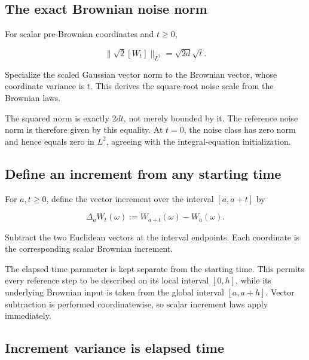 \documentclass[11pt,a4paper]{report}
\begin{document}
\subsection{\texorpdfstring{The exact Brownian noise norm}{The exact Brownian noise norm}}
\label{report-step-UnadjustedLangevin-GaussianMoments-lean-10}


For scalar pre-Brownian coordinates and \(t\ge0\),

\[\|\sqrt2[W_t]\|_{L^2}=\sqrt{2d}\sqrt t.\]

Specialize the scaled Gaussian vector norm to the Brownian vector, whose coordinate variance is \(t\). This derives the square-root noise scale from the Brownian laws.



The squared norm is exactly \(2dt\), not merely bounded by it. The reference noise norm is therefore given by this equality. At \(t=0\), the noise class has zero norm and hence equals zero in \(L^2\), agreeing with the integral-equation initialization.

\subsection{\texorpdfstring{Define an increment from any starting time}{Define an increment from any starting time}}
\label{report-step-UnadjustedLangevin-GaussianMoments-lean-11}


For \(a,t\ge0\), define the vector increment over the interval \([a,a+t]\) by

\[\Delta_aW_t(\omega):=W_{a+t}(\omega)-W_a(\omega).\]

Subtract the two Euclidean vectors at the interval endpoints. Each coordinate is the corresponding scalar Brownian increment.



The elapsed time parameter is kept separate from the starting time. This permits every reference step to be described on its local interval \([0,h]\), while its underlying Brownian input is taken from the global interval \([a,a+h]\). Vector subtraction is performed coordinatewise, so scalar increment laws apply immediately.

\subsection{\texorpdfstring{Increment variance is elapsed time}{Increment variance is elapsed time}}
\label{report-step-UnadjustedLangevin-GaussianMoments-lean-12}
\end{document}
